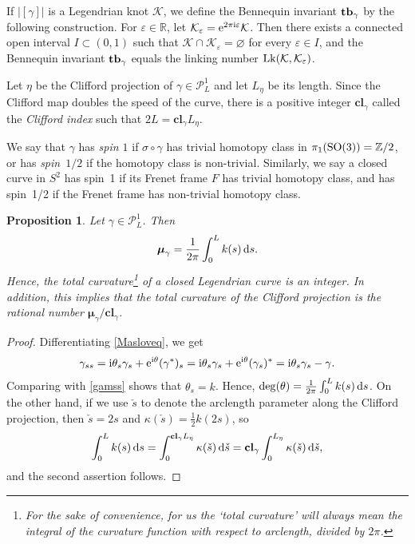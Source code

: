 \documentclass[10pt,a4paper]{amsart}
\newcommand\Legu{ {\mathcal P}^1} %
\newcommand\kk{k} %
\def\ri{\mathrm{i}}
\newcommand{\sdown}{\check{s}} %
\def\gam{\gamma} %
\def\R{\mathbb R}
\def\Z{\mathbb Z}
\newcommand\cl{\mathbf{cl}}
\numberwithin{equation}{section}
\newtheorem{Proposition}[Theorem]{Proposition}
 { \theoremstyle{definition}
\newtheorem{Definition}[Theorem]{Definition}
\newtheorem{Note}[Theorem]{Note}
\newtheorem{Example}[Theorem]{Example}
\newtheorem{Remark}[Theorem]{Remark} }
\begin{document}
If $|[\gam]|$ is a Legendrian knot ${\mathcal K}$, we define the Bennequin invariant ${\bf tb}_{\gamma}$ by the following construction.
For $\varepsilon\in \R$, let ${\mathcal K}_{\varepsilon}={\rm e}^{2\pi \ri\varepsilon}{\mathcal K}$. Then there exists
a connected open interval $I \subset (0,1)$ such that ${\mathcal K}\cap {\mathcal K}_{\varepsilon}=\varnothing$ for every $\varepsilon\in I$, and the Bennequin invariant ${\bf tb}_{\gamma}$ equals the linking number ${\rm Lk}({\mathcal K}, {\mathcal K}_{\varepsilon})$.

\begin{Definition}
Let $\eta$ be the Clifford projection of $\gam\in \Legu_L$ and let $L_{\eta}$ be its length. Since the Clifford map doubles the speed of the curve, there is a positive integer $\cl_{\gamma}$ called the {\it Clifford index}
such that $2L=\cl_{\gamma}L_{\eta}$.

We say that $\gam$ has {\it spin $1$} if $\sigma\circ \gam$ has trivial homotopy class in $\pi_1({\rm SO}(3)) =\Z/2$, or has {\it spin~$1/2$} if the homotopy class is non-trivial. Similarly, we say a closed curve in $S^2$ has spin~1 if its Frenet frame $F$ has trivial homotopy class,
and has spin~1/2 if the Frenet frame has non-trivial homotopy class.
\end{Definition}

\begin{Proposition}\label{Maslov} Let $\gam\in \Legu_L$. Then
\[{\boldsymbol \mu}_{\gamma}=\frac{1}{2\pi}\int_0^L \kk(s)\,{\rm d}s.\]
Hence, the total curvature\footnote{For the sake of convenience, for us the `total curvature' will always mean the integral of the curvature function with respect to arclength, {\em divided by} $2\pi$.} of a closed Legendrian curve is an integer. In addition, this implies that the total curvature of the Clifford projection is the rational number ${\boldsymbol \mu}_{\gamma}/\cl_{\gamma}$.
\end{Proposition}

\begin{proof} Differentiating \eqref{Masloveq}, we get
\[\gam_{ss}=\ri\theta_s \gam_s+{\rm e}^{\ri\theta}(\gam^*)_s=\ri\theta_s \gam_s+{\rm e}^{\ri\theta}(\gam_s)^*=\ri\theta_s \gam_s-\gam.\]
Comparing with \eqref{gamss} shows that $\theta_s=\kk$. Hence, $\operatorname{deg} (\theta)=\frac{1}{2\pi}\int_0^L \kk(s) \, {\rm d}s$.
On the other hand, if we use $\sdown$ to denote the arclength parameter along the Clifford projection, then $\sdown=2s$ and $\kappa(\sdown) = \tfrac12 \kk(2s)$, so
\[\int_0^L \kk(s)\,{\rm d}s = \int_0^{\cl_\gamma L_\eta} \kappa(\sdown)\,{\rm d}\sdown = \cl_\gamma \int_0^{L_\eta} \kappa(\sdown)\,{\rm d}\sdown,\]
and the second assertion follows.
\end{proof}
\end{document}
